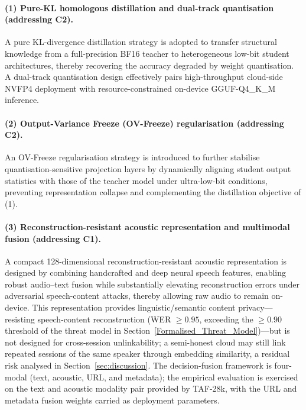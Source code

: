 \documentclass[a4paper,fleqn]{cas-sc}
\begin{document}
\paragraph{(1) Pure-KL homologous distillation and dual-track quantisation (addressing C2).}
A pure KL-divergence distillation strategy is adopted to transfer structural knowledge from a full-precision BF16 teacher to heterogeneous low-bit student architectures, thereby recovering the accuracy degraded by weight quantisation. A dual-track quantisation design effectively pairs high-throughput cloud-side NVFP4 deployment with resource-constrained on-device GGUF-Q4\_K\_M inference.

\paragraph{(2) Output-Variance Freeze (OV-Freeze) regularisation (addressing C2).}
An OV-Freeze regularisation strategy is introduced to further stabilise quantisation-sensitive projection layers by dynamically aligning student output statistics with those of the teacher model under ultra-low-bit conditions, preventing representation collapse and complementing the distillation objective of (1).

\paragraph{(3) Reconstruction-resistant acoustic representation and multimodal fusion (addressing C1).}
A compact 128-dimensional reconstruction-resistant acoustic representation is designed by combining handcrafted and deep neural speech features, enabling robust audio--text fusion while substantially elevating reconstruction errors under adversarial speech-content attacks, thereby allowing raw audio to remain on-device. This representation provides linguistic/semantic content privacy---resisting speech-content reconstruction (WER $\ge 0.95$, exceeding the $\ge 0.90$ threshold of the threat model in Section~\ref{Formalised_Threat_Model})---but is not designed for cross-session unlinkability; a semi-honest cloud may still link repeated sessions of the same speaker through embedding similarity, a residual risk analysed in Section~\ref{sec:discussion}. The decision-fusion framework is four-modal (text, acoustic, URL, and metadata); the empirical evaluation is exercised on the text and acoustic modality pair provided by TAF-28k, with the URL and metadata fusion weights carried as deployment parameters.
\end{document}
